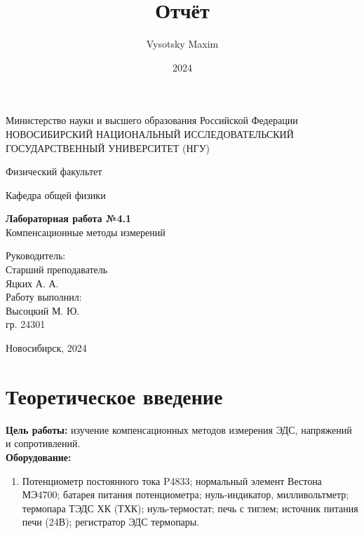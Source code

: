 \documentclass[a4paper,12pt]{article}
\author{Vysotsky Maxim}
\title{Отчёт}
\date{2024}
\begin{document}
	\begin{titlepage}
		\begin{center}
			{Министерство науки и высшего образования Российской Федерации
				НОВОСИБИРСКИЙ НАЦИОНАЛЬНЫЙ ИССЛЕДОВАТЕЛЬСКИЙ
				ГОСУДАРСТВЕННЫЙ УНИВЕРСИТЕТ (НГУ)}
		\end{center}
		\begin{center}
			{Физический факультет}
		\end{center}
		\begin{center}
			{Кафедра общей физики}
		\end{center}
		
		
		\vspace{7cm}
		{
			\begin{center}
				{\bf Лабораторная работа №4.1}\\
				Компенсационные методы измерений
			\end{center}
		}
		\vspace{2cm}
		\begin{flushright}
			{Руководитель:\\ Старший преподаватель\\
				Яцких А. А.\\
				Работу выполнил:\\
				Высоцкий М. Ю.\\
				\vspace{0.2cm}
				гр. 24301}
		\end{flushright}
		\vspace{3cm}
		\begin{center}
			Новосибирск, 2024
		\end{center}
	\end{titlepage}


\section{Теоретическое введение}
\textbf{Цель работы:} изучение компенсационных методов измерения ЭДС, напряжений и сопротивлений. \\

\textbf{Оборудование:} 
\begin{enumerate}
    \item Потенциометр постоянного тока P4833; нормальный элемент Вестона МЭ4700; батарея питания потенциометра; нуль-индикатор, милливольтметр; термопара ТЭДС ХК (ТХК); нуль-термостат; печь с тиглем; источник питания печи (24В); регистратор ЭДС термопары.
\end{enumerate}
\end{document}
